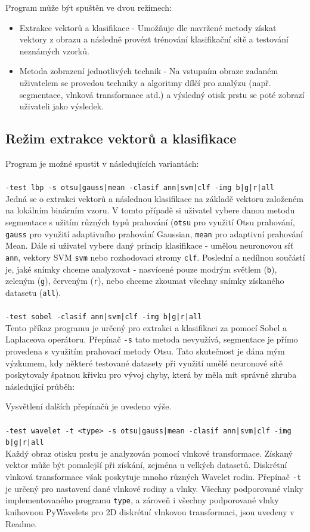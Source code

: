 Program může být spuštěn ve dvou režimech:
\begin{itemize}
    \item Extrakce vektorů a klasifikace - Umožňuje dle navržené metody získat vektory z obrazu a následně provézt trénování klasifikační sítě a testování neznámých vzorků.
    \item Metoda zobrazení jednotlivých technik - Na vstupním obraze zadaném uživatelem se provedou techniky a algoritmy dílčí pro analýzu (např. segmentace, vlnková transformace atd.) a výsledný otisk prstu se poté zobrazí uživateli jako výsledek.
\end{itemize}

\subsection{Režim extrakce vektorů a klasifikace}
Program je možné spustit v následujících variantách:\\\\
\verb=-test lbp -s otsu|gauss|mean -clasif ann|svm|clf -img b|g|r|all=\\
Jedná se o extrakci vektorů a následnou klasifikace na základě vektoru založeném na lokálním binárním vzoru. V tomto případě si uživatel vybere danou metodu segmentace s užitím různých typů prahování (\verb=otsu= pro využití Otsu prahování, \verb=gauss= pro využití adaptivního prahování Gaussian, \verb=mean= pro adaptivní prahování Mean. Dále si uživatel vybere daný princip klasifikace - umělou neuronovou síť \verb=ann=, vektory SVM \verb=svm= nebo rozhodovací stromy \verb=clf=. Poslední a nedílnou součástí je, jaké snímky chceme analyzovat - nasvícené pouze modrým světlem (\verb=b=), zeleným (\verb=g=), červeným (\verb=r=), nebo chceme zkoumat všechny snímky získaného datasetu (\verb=all=).\\\\
\verb=-test sobel -clasif ann|svm|clf -img b|g|r|all=\\
Tento příkaz programu je určený pro extrakci a klasifikaci za pomocí Sobel a Laplaceova operátoru. Přepínač \verb=-s= tato metoda nevyužívá, segmentace je přímo provedena s využitím prahovací metody Otsu. Tato skutečnost je dána mým výzkumem, kdy některé testované datasety při využití umělé neuronové sítě poskytovaly špatnou křivku pro vývoj chyby, která by měla mít správně zhruba následující průběh:

Vysvětlení dalších přepínačů je uvedeno výše.\\\\
\verb=-test wavelet -t <type> -s otsu|gauss|mean -clasif ann|svm|clf -img b|g|r|all=\\
Každý obraz otisku prstu je analyzován pomocí vlnkové transformace. Získaný vektor může být pomalejší při získání, zejména u velkých datasetů. Diskrétní vlnková transformace však poskytuje mnoho různých Wavelet rodin. Přepínač \verb=-t= je určený pro nastavení dané vlnkové rodiny a vlnky. Všechny podporované vlnky implementovaného programu \verb=type=, a zároveň i všechny podporované vlnky knihovnou PyWavelets pro 2D diskrétní vlnkovou transformaci, jsou uvedeny v Readme. 


